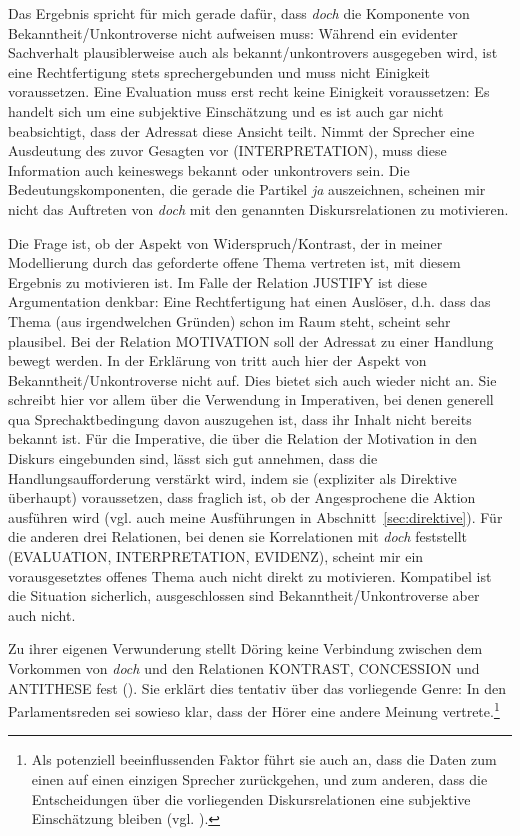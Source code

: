{Das Ergebnis spricht für mich gerade dafür, dass \textit{doch} die Komponente von Bekanntheit/Unkontroverse nicht aufweisen muss: Während ein evidenter Sach\-verhalt plausiblerweise auch als bekannt/unkontrovers ausgegeben wird, ist eine Rechtfertigung stets sprechergebunden und muss nicht Einigkeit voraussetzen. Eine Evaluation muss erst recht keine Einigkeit voraussetzen: Es handelt sich um eine subjektive Einschätzung und es ist auch gar nicht beabsichtigt, dass der Adressat diese Ansicht teilt. Nimmt der Sprecher eine Ausdeutung des zuvor Gesagten vor (INTERPRETATION), muss diese Information auch keineswegs bekannt oder unkontrovers sein. Die Bedeutungskomponenten, die gerade die Partikel \textit{ja} auszeichnen, scheinen mir nicht das Auftreten von \textit{doch} mit den ge\-nannten Diskursrelationen zu motivieren. 

Die Frage ist, ob der Aspekt von Widerspruch/Kontrast, der in meiner Modellierung durch das geforderte offene Thema vertreten ist, mit diesem Ergebnis zu motivieren ist. Im Falle der Relation JUSTIFY ist diese Argumentation denkbar: Eine Rechtfertigung hat einen Auslöser, d.h. dass das Thema (aus irgendwelchen Gründen) schon im Raum steht, scheint sehr plausibel. Bei der Relation MOTIVATION soll der Adressat zu einer Handlung bewegt werden. In der Erklärung von \citet[89]{Doering2014} tritt auch hier der Aspekt von Bekanntheit/Unkontroverse nicht auf. Dies bietet sich auch wieder nicht an. Sie schreibt hier vor allem über die Verwendung in Imperativen, bei denen generell qua Sprechaktbedingung davon auszugehen ist, dass ihr Inhalt nicht bereits bekannt ist. Für die Imperative, die über die Relation der Motivation in den Diskurs eingebunden sind, lässt sich gut annehmen, dass die Handlungsaufforderung verstärkt wird, indem sie (expliziter als Direktive überhaupt) voraussetzen, dass fraglich ist, ob der Angesprochene die Aktion ausführen wird (vgl. auch meine Ausführungen in Abschnitt~\ref{sec:direktive}). Für die anderen drei Relationen, bei denen sie Korrelationen mit \textit{doch} feststellt (EVALUATION, INTERPRETATION, EVIDENZ), scheint mir ein vorausgesetztes offenes Thema auch nicht direkt zu motivieren. Kompatibel ist die Situation sicherlich, ausgeschlossen sind Bekanntheit/Unkontroverse aber auch nicht.

Zu ihrer eigenen Verwunderung stellt Döring keine Verbindung zwischen dem Vorkommen von \textit{doch} und den Relationen KONTRAST, CONCESSION und ANTITHESE fest (\citeyear[89]{Doering2014}). Sie erklärt dies tentativ über das vorliegende Genre: In den Parlamentsreden sei sowieso klar, dass der Hörer eine andere Meinung vertrete.\footnote{Als potenziell beeinflussenden Faktor führt sie auch an, dass die Daten zum einen auf einen einzigen Sprecher zurückgehen, und zum anderen, dass die Entscheidungen über die vorliegenden Diskursrelationen eine subjektive Einschätzung bleiben (vgl. \citeyear[90]{Doering2014}).}

}
